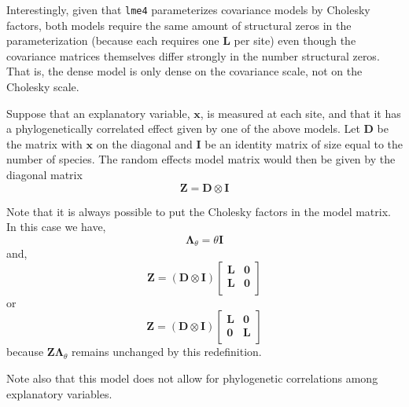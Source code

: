 \documentclass[12pt]{article}\usepackage[]{graphicx}\usepackage[]{color}
\begin{document}
Interestingly, given that \texttt{lme4} parameterizes covariance
models by Cholesky factors, both models require the same amount of
structural zeros in the parameterization (because each requires one
$\bm L$ per site) even though the covariance matrices themselves
differ strongly in the number structural zeros.  That is, the dense
model is only dense on the covariance scale, not on the Cholesky
scale.

Suppose that an explanatory variable, $\bm x$, is measured at each
site, and that it has a phylogenetically correlated effect given by
one of the above models.  Let $\bm D$ be the matrix with $\bm x$ on
the diagonal and $\bm I$ be an identity matrix of size equal to the
number of species.  The random effects model matrix would then
be given by the diagonal matrix
\begin{equation}
  \label{eq:3}
  \bm Z = \bm D \otimes \bm I
\end{equation}

Note that it is always possible to put the Cholesky factors in the
model matrix.  In this case we have,
\begin{equation}
  \label{eq:4}
  \bm\Lambda_\theta = \theta\bm I
\end{equation}
and,
\begin{equation}
  \label{eq:5}
  \bm Z =
  (\bm D \otimes \bm I)
  \begin{bmatrix}
    \bm L & \bm 0 \\
    \bm L & \bm 0 \\
  \end{bmatrix}
\end{equation}
or
\begin{equation}
  \label{eq:5}
  \bm Z =
  (\bm D \otimes \bm I)
  \begin{bmatrix}
    \bm L & \bm 0 \\
    \bm 0 & \bm L \\
  \end{bmatrix}
\end{equation}
because $\bm Z\bm\Lambda_\theta$ remains unchanged by this
redefinition.

Note also that this model does not allow for phylogenetic correlations
among explanatory variables.

\end{document}
